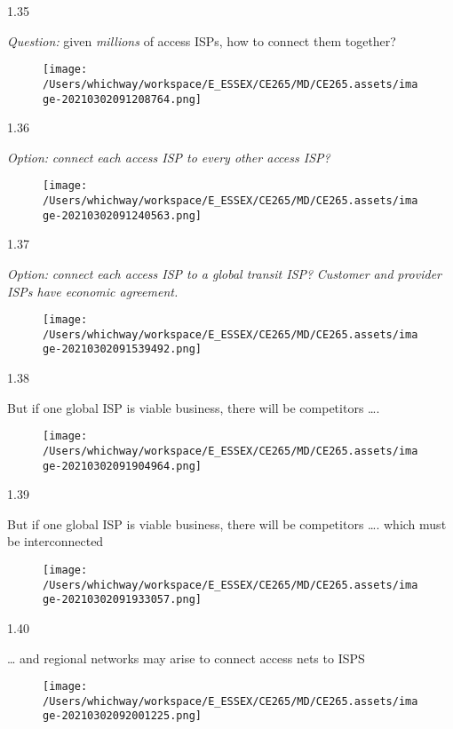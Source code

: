 \documentclass[
]{article}
\begin{document}
1.35

\emph{Question:} given \emph{millions} of access ISPs, how to connect
them together?

\begin{figure}
\centering
\texttt{[image: /Users/whichway/workspace/E\_ESSEX/CE265/MD/CE265.assets/image-20210302091208764.png]}
\caption{}
\end{figure}

1.36

\emph{Option:} \emph{connect each access ISP to every other access ISP?}

\begin{figure}
\centering
\texttt{[image: /Users/whichway/workspace/E\_ESSEX/CE265/MD/CE265.assets/image-20210302091240563.png]}
\caption{}
\end{figure}

1.37

\emph{Option:} \emph{connect each access ISP to a global transit ISP?}
\emph{Customer} \emph{and} \emph{provider} \emph{ISPs have economic
agreement.}

\begin{figure}
\centering
\texttt{[image: /Users/whichway/workspace/E\_ESSEX/CE265/MD/CE265.assets/image-20210302091539492.png]}
\caption{}
\end{figure}

1.38

But if one global ISP is viable business, there will be competitors
\ldots.

\begin{figure}
\centering
\texttt{[image: /Users/whichway/workspace/E\_ESSEX/CE265/MD/CE265.assets/image-20210302091904964.png]}
\caption{}
\end{figure}

1.39

But if one global ISP is viable business, there will be competitors
\ldots. which must be interconnected

\begin{figure}
\centering
\texttt{[image: /Users/whichway/workspace/E\_ESSEX/CE265/MD/CE265.assets/image-20210302091933057.png]}
\caption{}
\end{figure}

1.40

\ldots{} and regional networks may arise to connect access nets to ISPS

\begin{figure}
\centering
\texttt{[image: /Users/whichway/workspace/E\_ESSEX/CE265/MD/CE265.assets/image-20210302092001225.png]}
\caption{}
\end{figure}
\end{document}
